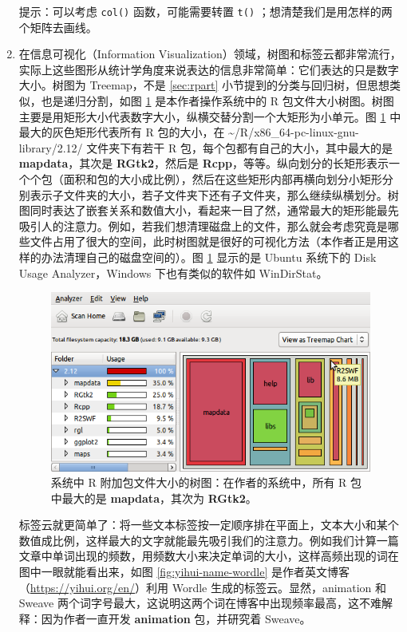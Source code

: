 \documentclass[
  b5paper,
  UTF8,twoside]{book}
\begin{document}
\begin{enumerate}
  提示：可以考虑 \texttt{col()} 函数，可能需要转置 \texttt{t()} ；想清楚我们是用怎样的两个矩阵去画线。
\item
  在信息可视化（Information
  Visualization）领域，树图和标签云都非常流行，实际上这些图形从统计学角度来说表达的信息非常简单：它们表达的只是数字大小。树图为 Treemap，不是 \ref{sec:rpart} 小节提到的分类与回归树，但思想类似，也是递归分割，如图 \ref{fig:disk-usage} 是本作者操作系统中的 R 包文件大小树图。树图主要是用矩形大小代表数字大小，纵横交替分割一个大矩形为小单元。图 \ref{fig:disk-usage} 中最大的灰色矩形代表所有 R 包的大小，在 \textasciitilde/R/x86\_64-pc-linux-gnu-library/2.12/ 文件夹下有若干 R 包，每个包都有自己的大小，其中最大的是 \textbf{mapdata}，其次是 \textbf{RGtk2}，然后是 \textbf{Rcpp}，等等。纵向划分的长矩形表示一个个包（面积和包的大小成比例），然后在这些矩形内部再横向划分小矩形分别表示子文件夹的大小，若子文件夹下还有子文件夹，那么继续纵横划分。树图同时表达了嵌套关系和数值大小，看起来一目了然，通常最大的矩形能最先吸引人的注意力。例如，若我们想清理磁盘上的文件，那么就会考虑究竟是哪些文件占用了很大的空间，此时树图就是很好的可视化方法（本作者正是用这样的办法清理自己的磁盘空间的）。图 \ref{fig:disk-usage} 显示的是 Ubuntu 系统下的 Disk Usage Analyzer，Windows 下也有类似的软件如 WinDirStat。

  \begin{figure}

  {\centering \includegraphics{images/disk-usage} 

  }

  \caption[系统中 R 附加包文件大小的树图]{系统中 R 附加包文件大小的树图：在作者的系统中，所有 R 包中最大的是 \textbf{mapdata}，其次为 \textbf{RGtk2}。}\label{fig:disk-usage}
  \end{figure}

  标签云就更简单了：将一些文本标签按一定顺序排在平面上，文本大小和某个数值成比例，这样最大的文字就能最先吸引我们的注意力。例如我们计算一篇文章中单词出现的频数，用频数大小来决定单词的大小，这样高频出现的词在图中一眼就能看出来，如图 \ref{fig:yihui-name-wordle} 是作者英文博客（\url{https://yihui.org/en/}）利用 Wordle 生成的标签云。显然，animation 和 Sweave 两个词字号最大，这说明这两个词在博客中出现频率最高，这不难解释：因为作者一直开发 \textbf{animation} 包，并研究着 Sweave。


\end{enumerate}
\end{document}
